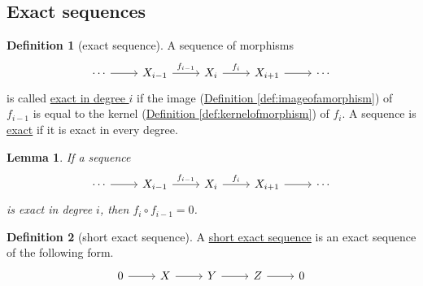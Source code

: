 \documentclass[a4paper,10pt]{scrreprt}
\newcommand{\defn}[1]{\ul{#1}}
\theoremstyle{definition}
\newtheorem{definition}{Definition}[section]
\theoremstyle{plain}
\newtheorem{lemma}{Lemma}[section]
\theoremstyle{remark}
\begin{document}
\subsection{Exact sequences}
\begin{definition}[exact sequence]
  \label{def:exactsequence}
  A sequence of morphisms
  \begin{equation*}
    \begin{tikzcd}
      \cdots
      \arrow[r]
      & X_{i-1}
      \arrow[r, "f_{i-1}"]
      & X_{i}
      \arrow[r, "f_{i}"]
      & X_{i+1}
      \arrow[r]
      & \cdots
    \end{tikzcd}
  \end{equation*}
  is called \defn{exact in degree $i$} if the image (\hyperref[def:imageofamorphism]{Definition \ref*{def:imageofamorphism}}) of $f_{i-1}$ is equal to the kernel (\hyperref[def:kernelofmorphism]{Definition \ref*{def:kernelofmorphism}}) of $f_{i}$. A sequence is \defn{exact} if it is exact in every degree.
\end{definition}

\begin{lemma}
  If a sequence
  \begin{equation*}
    \begin{tikzcd}
      \cdots
      \arrow[r]
      & X_{i-1}
      \arrow[r, "f_{i-1}"]
      & X_{i}
      \arrow[r, "f_{i}"]
      & X_{i+1}
      \arrow[r]
      & \cdots
    \end{tikzcd}
  \end{equation*}
  is exact in degree $i$, then $f_{i} \circ f_{i-1} = 0$.
\end{lemma}

\begin{definition}[short exact sequence]
  \label{def:shortexactsequence}
  A \defn{short exact sequence} is an exact sequence of the following form.
  \begin{equation*}
    \begin{tikzcd}
      0
      \arrow[r]
      & X
      \arrow[r]
      & Y
      \arrow[r]
      & Z
      \arrow[r]
      & 0
    \end{tikzcd}
  \end{equation*}
\end{definition}
\end{document}
